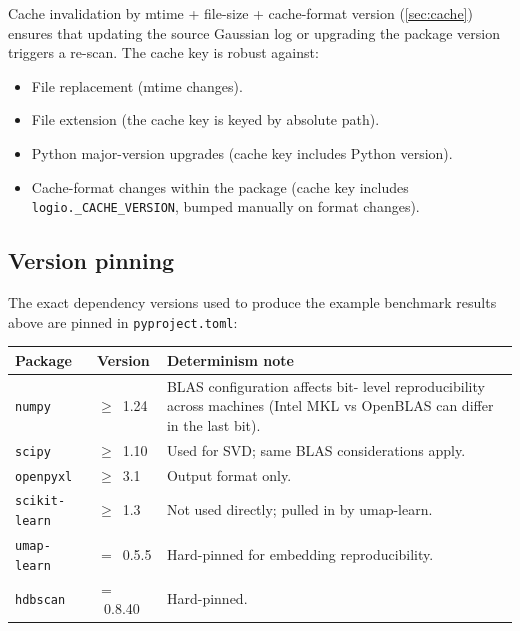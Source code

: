 \documentclass[10pt,a4paper,twoside]{article}
\newcommand{\fn}[1]{\texttt{#1}}
\newcommand{\file}[1]{\texttt{#1}}
\begin{document}
Cache invalidation by mtime + file-size + cache-format version
(\cref{sec:cache}) ensures that updating the source Gaussian log
or upgrading the package version triggers a re-scan. The cache
key is robust against:

\begin{itemize}
  \item File replacement (mtime changes).
  \item File extension (the cache key is keyed by absolute path).
  \item Python major-version upgrades (cache key includes Python
        version).
  \item Cache-format changes within the package (cache key
        includes \fn{logio.\_CACHE\_VERSION}, bumped manually on
        format changes).
\end{itemize}

\subsection{Version pinning}

The exact dependency versions used to produce the example
benchmark results above are pinned in \file{pyproject.toml}:

\begin{longtable}{p{} p{} p{}}
\toprule
\textbf{Package} & \textbf{Version} & \textbf{Determinism note} \\
\midrule
\texttt{numpy}        & $\geq$~1.24  & BLAS configuration affects bit-
                                       level reproducibility across
                                       machines (Intel MKL vs OpenBLAS
                                       can differ in the last bit). \\
\texttt{scipy}        & $\geq$~1.10  & Used for SVD; same BLAS
                                       considerations apply. \\
\texttt{openpyxl}     & $\geq$~3.1   & Output format only. \\
\texttt{scikit-learn} & $\geq$~1.3   & Not used directly; pulled in
                                       by umap-learn. \\
\texttt{umap-learn}   & $=$~0.5.5    & Hard-pinned for embedding
                                       reproducibility. \\
\texttt{hdbscan}      & $=$~0.8.40   & Hard-pinned. \\
\bottomrule
\end{longtable}
\end{document}
